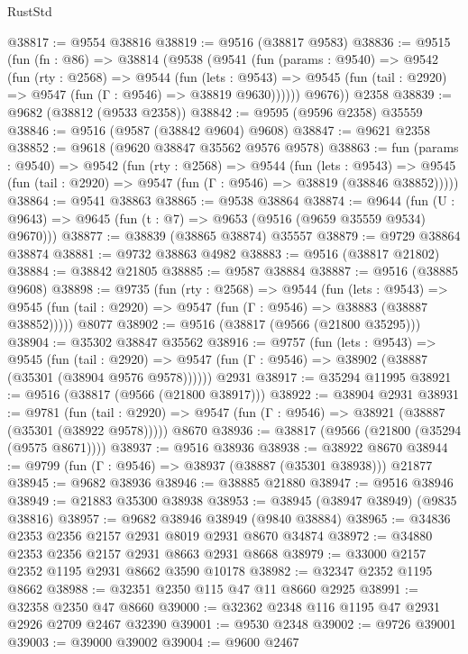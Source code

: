 \begin{lexlean}{RustStd}
\begin{coremodule}
@38817 := @9554 @38816
@38819 := @9516 (@38817 @9583)
@38836 := @9515
    (fun (fn : @86) =>
    @38814
      (@9538
        (@9541
          (fun (params : @9540) =>
          @9542
            (fun (rty : @2568) =>
            @9544
              (fun (lets : @9543) =>
              @9545 (fun (tail : @2920) => @9547 (fun (Γ : @9546) => @38819 @9630))))))
        @9676))
    @2358
@38839 := @9682 (@38812 (@9533 @2358))
@38842 := @9595 (@9596 @2358) @35559
@38846 := @9516 (@9587 (@38842 @9604) @9608)
@38847 := @9621 @2358
@38852 := @9618 (@9620 @38847 @35562 @9576 @9578)
@38863 := fun (params : @9540) =>
  @9542
    (fun (rty : @2568) =>
    @9544
      (fun (lets : @9543) =>
      @9545 (fun (tail : @2920) => @9547 (fun (Γ : @9546) => @38819 (@38846 @38852)))))
@38864 := @9541 @38863
@38865 := @9538 @38864
@38874 := @9644
    (fun (U : @9643) => @9645 (fun (t : @7) => @9653 (@9516 (@9659 @35559 @9534) @9670)))
@38877 := @38839 (@38865 @38874) @35557
@38879 := @9729 @38864 @38874
@38881 := @9732 @38863 @4982
@38883 := @9516 (@38817 @21802)
@38884 := @38842 @21805
@38885 := @9587 @38884
@38887 := @9516 (@38885 @9608)
@38898 := @9735
    (fun (rty : @2568) =>
    @9544
      (fun (lets : @9543) =>
      @9545 (fun (tail : @2920) => @9547 (fun (Γ : @9546) => @38883 (@38887 @38852)))))
    @8077
@38902 := @9516 (@38817 (@9566 (@21800 @35295)))
@38904 := @35302 @38847 @35562
@38916 := @9757
    (fun (lets : @9543) =>
    @9545
      (fun (tail : @2920) =>
      @9547 (fun (Γ : @9546) => @38902 (@38887 (@35301 (@38904 @9576 @9578))))))
    @2931
@38917 := @35294 @11995
@38921 := @9516 (@38817 (@9566 (@21800 @38917)))
@38922 := @38904 @2931
@38931 := @9781
    (fun (tail : @2920) => @9547 (fun (Γ : @9546) => @38921 (@38887 (@35301 (@38922 @9578)))))
    @8670
@38936 := @38817 (@9566 (@21800 (@35294 (@9575 @8671))))
@38937 := @9516 @38936
@38938 := @38922 @8670
@38944 := @9799 (fun (Γ : @9546) => @38937 (@38887 (@35301 @38938))) @21877
@38945 := @9682 @38936
@38946 := @38885 @21880
@38947 := @9516 @38946
@38949 := @21883 @35300 @38938
@38953 := @38945 (@38947 @38949) (@9835 @38816)
@38957 := @9682 @38946 @38949 (@9840 @38884)
@38965 := @34836 @2353 @2356 @2157 @2931 @8019 @2931 @8670 @34874
@38972 := @34880 @2353 @2356 @2157 @2931 @8663 @2931 @8668
@38979 := @33000 @2157 @2352 @1195 @2931 @8662 @3590 @10178
@38982 := @32347 @2352 @1195 @8662
@38988 := @32351 @2350 @115 @47 @11 @8660 @2925
@38991 := @32358 @2350 @47 @8660
@39000 := @32362 @2348 @116 @1195 @47 @2931 @2926 @2709 @2467 @32390
@39001 := @9530 @2348
@39002 := @9726 @39001
@39003 := @39000 @39002
@39004 := @9600 @2467

\end{coremodule}
\end{lexlean}
